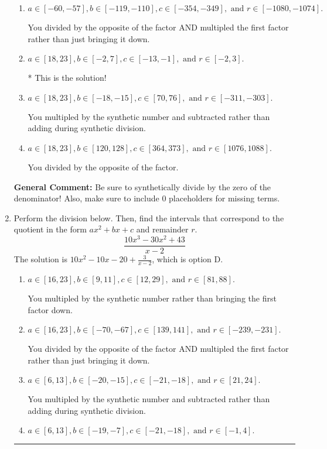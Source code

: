 \documentclass{extbook}[14pt]
\newcommand{\litem}[1]{\item #1

\rule{\textwidth}{0.4pt}}
\begin{document}
\begin{enumerate}
{\begin{enumerate}[label=\Alph*.]
 You multipled by the synthetic number rather than bringing the first factor down.
\item \( a \in [-60, -57], b \in [-119, -110], c \in [-354, -349], \text{ and } r \in [-1080, -1074]. \)

 You divided by the opposite of the factor AND multipled the first factor rather than just bringing it down.
\item \( a \in [18, 23], b \in [-2, 7], c \in [-13, -1], \text{ and } r \in [-2, 3]. \)

* This is the solution!
\item \( a \in [18, 23], b \in [-18, -15], c \in [70, 76], \text{ and } r \in [-311, -303]. \)

 You multipled by the synthetic number and subtracted rather than adding during synthetic division.
\item \( a \in [18, 23], b \in [120, 128], c \in [364, 373], \text{ and } r \in [1076, 1088]. \)

 You divided by the opposite of the factor.
\end{enumerate}

\textbf{General Comment:} Be sure to synthetically divide by the zero of the denominator! Also, make sure to include 0 placeholders for missing terms.
}
\litem{
Perform the division below. Then, find the intervals that correspond to the quotient in the form $ax^2+bx+c$ and remainder $r$.
\[ \frac{10x^{3} -30 x^{2} + 43}{x -2} \]The solution is \( 10x^{2} -10 x -20 + \frac{3}{x -2} \), which is option D.\begin{enumerate}[label=\Alph*.]
\item \( a \in [16, 23], b \in [9, 11], c \in [12, 29], \text{ and } r \in [81, 88]. \)

 You multipled by the synthetic number rather than bringing the first factor down.
\item \( a \in [16, 23], b \in [-70, -67], c \in [139, 141], \text{ and } r \in [-239, -231]. \)

 You divided by the opposite of the factor AND multipled the first factor rather than just bringing it down.
\item \( a \in [6, 13], b \in [-20, -15], c \in [-21, -18], \text{ and } r \in [21, 24]. \)

 You multipled by the synthetic number and subtracted rather than adding during synthetic division.
\item \( a \in [6, 13], b \in [-19, -7], c \in [-21, -18], \text{ and } r \in [-1, 4]. \)


\end{enumerate}}
\end{enumerate}
\end{document}
